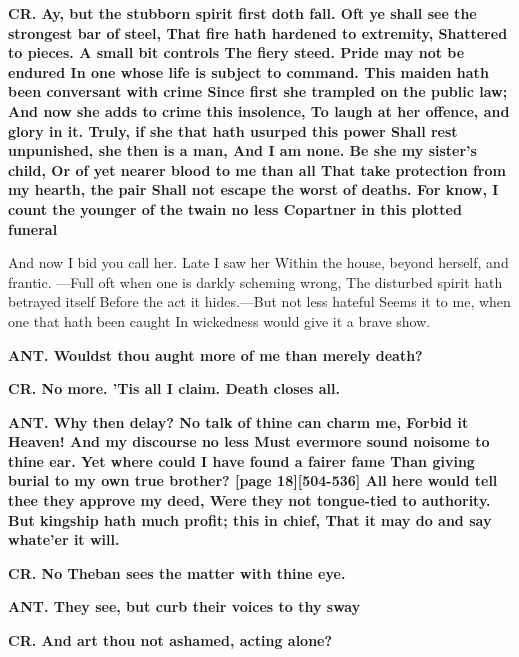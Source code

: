\documentclass[11pt,letter]{book}
\begin{document}
\par \textbf{CR. Ay, but the stubborn spirit first doth fall. Oft ye shall see the strongest bar of steel, That fire hath hardened to extremity, Shattered to pieces. A small bit controls The fiery steed. Pride may not be endured In one whose life is subject to command. This maiden hath been conversant with crime Since first she trampled on the public law; And now she adds to crime this insolence, To laugh at her offence, and glory in it. Truly, if she that hath usurped this power Shall rest unpunished, she then is a man, And I am none. Be she my sister’s child, Or of yet nearer blood to me than all That take protection from my hearth, the pair Shall not escape the worst of deaths. For know, I count the younger of the twain no less Copartner in this plotted funeral}
\par   And now I bid you call her. Late I saw her Within the house, beyond herself, and frantic. —Full oft when one is darkly scheming wrong, The disturbed spirit hath betrayed itself Before the act it hides.—But not less hateful Seems it to me, when one that hath been caught In wickedness would give it a brave show.

\par \textbf{ANT. Wouldst thou aught more of me than merely death?}
\par 

\par \textbf{CR. No more. ’Tis all I claim. Death closes all.}
\par 

\par \textbf{ANT. Why then delay? No talk of thine can charm me, Forbid it Heaven! And my discourse no less Must evermore sound noisome to thine ear. Yet where could I have found a fairer fame Than giving burial to my own true brother? [page 18][504-536] All here would tell thee they approve my deed, Were they not tongue-tied to authority. But kingship hath much profit; this in chief, That it may do and say whate’er it will.}
\par 

\par \textbf{CR. No Theban sees the matter with thine eye.}
\par 

\par \textbf{ANT. They see, but curb their voices to thy sway}
\par 

\par \textbf{CR. And art thou not ashamed, acting alone?}
\par 
\end{document}
